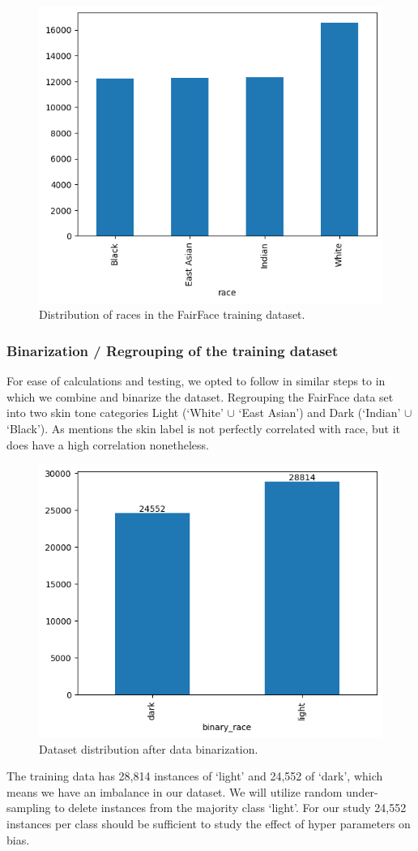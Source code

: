 \documentclass[conference]{IEEEtran}
\begin{document}
\begin{figure}[hbt!]
    \centerline{\includegraphics[width=0.5\linewidth]{latex/images/fairFaceOriginalDistribution.png}}
    \caption{Distribution of races in the FairFace training dataset.}
    \label{racial_distribution}
\end{figure}

\subsubsection{Binarization / Regrouping of the training dataset}
For ease of calculations and testing, we opted to follow in similar steps to\cite{dhar2022distill} in which we combine and binarize the dataset. Regrouping the FairFace\cite{karkkainen2021fairface} data set into two skin tone categories Light (‘White’ $\cup$ ‘East Asian’) and Dark (‘Indian’ $\cup$ ‘Black’). As \cite{dhar2022distill} mentions the skin label is not perfectly correlated with race, but it does have a high correlation nonetheless. 

\begin{figure}[hbt!]
    \centerline{\includegraphics[width=0.5\linewidth]{latex/images/RegroupDistributionFairFace.png}}
    \caption{Dataset distribution after data binarization.}
    \label{binarized_data}
\end{figure}

The training data has 28,814 instances of ‘light’ and 24,552 of ‘dark’, which means we have an imbalance in our dataset. We will utilize random under-sampling to delete instances from the majority class ‘light’. For our study 24,552 instances per class should be sufficient to study the effect of hyper parameters on bias.
\end{document}
